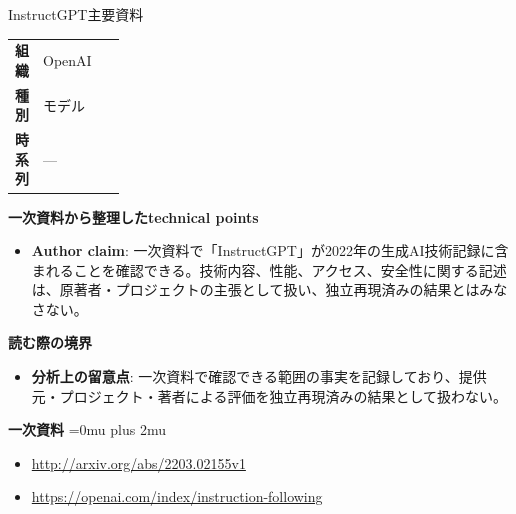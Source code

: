 \begin{technicalnote}{InstructGPT}{主要資料}
\begingroup
\begin{tabularx}{\linewidth}{@{}>{\bfseries}p{0.22\linewidth}X@{}}
組織 & OpenAI \\
種別 & モデル \\
時系列 & — \\
\end{tabularx}
\smallskip
{\bfseries 一次資料から整理したtechnical points}
\begin{itemize}[leftmargin=1.5em,itemsep=0.35em]
\item \textbf{Author claim}: 一次資料で「InstructGPT」が2022年の生成AI技術記録に含まれることを確認できる。技術内容、性能、アクセス、安全性に関する記述は、原著者・プロジェクトの主張として扱い、独立再現済みの結果とはみなさない。
\end{itemize}
\begin{minipage}{\linewidth}
{\bfseries 読む際の境界}
\begin{itemize}[leftmargin=1.5em,itemsep=0.35em]
\item \textbf{分析上の留意点}: 一次資料で確認できる範囲の事実を記録しており、提供元・プロジェクト・著者による評価を独立再現済みの結果として扱わない。
\end{itemize}
\begin{samepage}
{\bfseries 一次資料}
\begingroup\sloppy
\Urlmuskip=0mu plus 2mu\relax
\begin{itemize}[leftmargin=1.5em,itemsep=0.25em]
\item {\scriptsize\url{http://arxiv.org/abs/2203.02155v1}}
\item {\scriptsize\url{https://openai.com/index/instruction-following}}
\end{itemize}
\endgroup
\end{samepage}
\end{minipage}
\endgroup
\end{technicalnote}
\medskip

